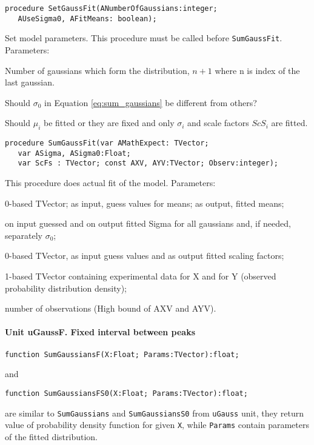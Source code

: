 \documentclass[12pt,a4paper,oneside]{article}
\newcommand{\code}[1]{\texttt{#1}}
\begin{document}
\begin{verbatim}
procedure SetGaussFit(ANumberOfGaussians:integer; 
   AUseSigma0, AFitMeans: boolean);
\end{verbatim}\vspace{-6pt}
Set model parameters. This procedure must be called before \code{SumGaussFit}.\\ Parameters:\vspace{-6pt}
\begin{description}[noitemsep]
	\item[ANumberOfGaussians] Number of gaussians which form the distribution, $n+1$ where n is index of the last gaussian.
	\item[AUseSigma0] Should $\sigma_0$ in Equation \ref{eq:sum_gaussians} be different from others?
	\item[AFitMeans] Should  $\mu_i$ be fitted or they are fixed and only $\sigma_i$ and scale factors $ScS_i$ are fitted.
\end{description}
\begin{verbatim}
procedure SumGaussFit(var AMathExpect: TVector; 
   var ASigma, ASigma0:Float;
   var ScFs : TVector; const AXV, AYV:TVector; Observ:integer);
\end{verbatim}
This procedure does actual fit of the model. Parameters:
\begin{description}[noitemsep]
	\item[AMathExpect] 0-based TVector; as input, guess values for means; as output, fitted means;
	\item[ASigma, ASigma0] on input guessed and on output fitted Sigma for all gaussians and, if needed, separately $\sigma_0$;
	\item[ScFs] 0-based TVector, as input guess values and as output fitted scaling factors;
	\item[AXV, AYV] 1-based TVector containing experimental data for X and for Y (observed probability distribution density);
	\item[Observ] number of observations (High bound of AXV and AYV).
\end{description}
\paragraph{Unit uGaussF. Fixed interval between peaks}
\begin{verbatim}
function SumGaussiansF(X:Float; Params:TVector):float;
\end{verbatim}
and
\begin{verbatim}
function SumGaussiansFS0(X:Float; Params:TVector):float;
\end{verbatim}
are similar to \code{SumGaussians} and \code{SumGaussiansS0} from \code{uGauss} unit, they return value of probability density function for given \code{X}, while \code{Params} contain parameters of the fitted distribution.
\end{document}

